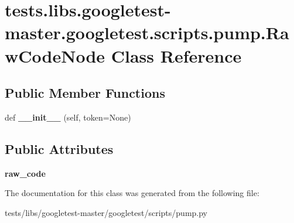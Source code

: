 \hypertarget{classtests_1_1libs_1_1googletest-master_1_1googletest_1_1scripts_1_1pump_1_1RawCodeNode}{}\section{tests.\+libs.\+googletest-\/master.googletest.\+scripts.\+pump.\+Raw\+Code\+Node Class Reference}
\label{classtests_1_1libs_1_1googletest-master_1_1googletest_1_1scripts_1_1pump_1_1RawCodeNode}
\subsection*{Public Member Functions}
\begin{DoxyCompactItemize}
\item 
\mbox{\label{classtests_1_1libs_1_1googletest-master_1_1googletest_1_1scripts_1_1pump_1_1RawCodeNode_a38d0b0c60ecd414c51e033aa3d514831}} 
def {\bfseries \+\_\+\+\_\+init\+\_\+\+\_\+} (self, token=None)
\end{DoxyCompactItemize}
\subsection*{Public Attributes}
\begin{DoxyCompactItemize}
\item 
\mbox{\label{classtests_1_1libs_1_1googletest-master_1_1googletest_1_1scripts_1_1pump_1_1RawCodeNode_a6bfb0ea6785559e4ba9685ed3bd7c63f}} 
{\bfseries raw\+\_\+code}
\end{DoxyCompactItemize}


The documentation for this class was generated from the following file\+:\begin{DoxyCompactItemize}
\item 
tests/libs/googletest-\/master/googletest/scripts/pump.\+py\end{DoxyCompactItemize}
